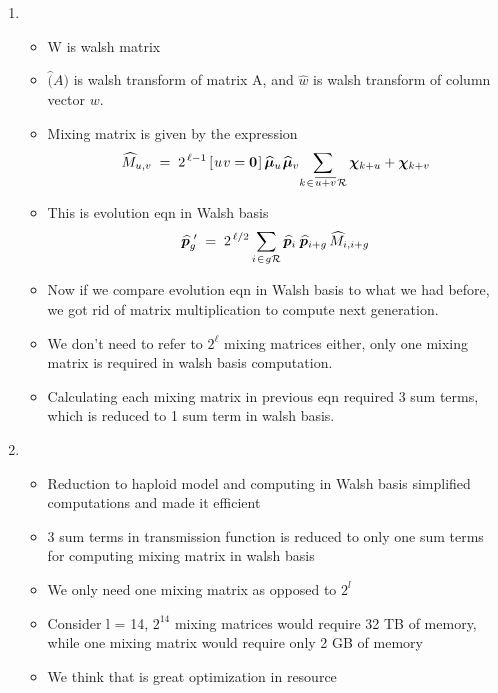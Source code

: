 \documentclass{article}
\newcommand{\nudge}{\hspace{0.01in}}
\begin{document}
\begin{enumerate}
\item
  \begin{itemize}
  \item W is walsh matrix
  \item $\hat(A)$ is walsh transform of matrix A, 
    and $\hat{w}$ is walsh transform of column vector $w$.
  \item Mixing matrix is given by the expression
    \[
      \widehat{M}_{u,v} \; = \; 2^{\,\ell-1} \,[\nudge u \nudge v = {\bf
      0}\nudge]\, \widehat{\bm{\mu}}_u \nudge \widehat{\bm{\mu}}_v \!  \sum_{k
    \nudge \in \nudge \overline{u+v} \nudge \mathcal{R}} \bm{\chi}_{k + u} +
    \bm{\chi}_{k + v}
    \]
  \item This is  evolution eqn in Walsh basis 
  \[
    \widehat{\bm{p}}_g^{\,\,\prime} \; = \; 2^{\,\ell/2} \sum_{i \nudge \in \nudge g \mathcal{R}}
    \widehat{\bm{p}}_i \, \nudge \widehat{\bm{p}}_{i+g} \,\widehat{M}_{i,i+g}
  \]
  \item Now if we compare evolution eqn in Walsh basis to what we had before, we got rid of matrix multiplication to compute next generation. 
  \item We don't need to refer to $2^\ell$ mixing matrices either, only one mixing matrix is required in walsh basis computation.
  \item Calculating each mixing matrix in previous eqn required 3 sum terms, which is reduced to 1 sum term in walsh basis.
  \end{itemize}
    
\item
  \begin{itemize}
  \item Reduction to haploid model and computing in Walsh basis
    simplified computations and made it efficient
  \item 3 sum terms in transmission function is reduced to only one sum terms for computing mixing matrix in walsh basis 
  \item We only need one mixing matrix as opposed to $2^l$
  \item Consider l = 14, $2^{14}$ mixing matrices would require 32 TB of
    memory, while one mixing matrix would require only 2 GB of memory
  \item We think that is great optimization in resource
  \end{itemize}
    

\end{enumerate}
\end{document}
